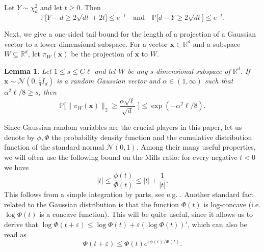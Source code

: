 \documentclass[11pt]{amsart}
\newtheorem{lemma}[theorem]{\bf Lemma}
\theoremstyle{definition}
\def\eps{\varepsilon}
\def\cN{\mathcal{N}}
\def\bR{\mathbb{R}}
\def\Pb{\mathbb{P}}
\def\bx{\boldsymbol{x}}
\begin{document}
\begin{theorem}\label{thm:laurent_massart}
Let $Y\sim\chi^2_d$ and let $t\ge0$. Then
{\smaller[0.3]
\[ \Pb\big[Y-d\ge 2\sqrt{dt}+2t\big]\le e^{-t} \quad\text{and}\quad \Pb\big[d-Y\ge 2\sqrt{dt}\big]\le e^{-t}. \]
}
\end{theorem}

Next, we give a one-sided tail bound for the length of a projection of a Gaussian vector to a lower-dimensional subspace. For a vector $\bx\in \bR^d$ and a subspace $W\subseteq \bR^d$, let $\pi_W(\bx)$ be the projection of $\bx$ to $W$.

\begin{lemma}\label{lemma:norm_projection}
Let $1\leq s\leq C\ell$ and let $W$ be any $s$-dimensional subspace of $\bR^d$. If $\bx\sim \cN(0, \frac{1}{d}I_d)$ is a random Gaussian vector and $\alpha\in (1, \infty)$ such that $\alpha^2\ell/8\geq s$, then
{\smaller[0.3]
\[\Pb\Big[\|\pi_W(\bx)\|_2\geq \frac{\alpha\sqrt{\ell}}{\sqrt{d}}\,\,\Big]\leq \exp(-\alpha^2\ell/8).\]
}
\end{lemma}


Since Gaussian random variables are the crucial players in this paper, let us denote by $\phi, \Phi$ the probability density function and the cumulative distribution function of the standard normal $\cN(0, 1)$. Among their many useful properties, we will often use the following bound on the Mills ratio: for every negative $t<0$ we have
{\smaller[0.3]
\begin{equation}\label{eqn:mills_ratio}
|t|\leq \frac{\phi(t)}{\Phi(t)}\leq |t|+\frac{1}{|t|}.
\end{equation}
}
This follows from a simple integration by parts, see e.g. \cite{Gor41}. Another standard fact related to the Gaussian distribution is that the function $\Phi(t)$ is log-concave (i.e. $\log \Phi(t)$ is a concave function). This will be quite useful, since it allows us to derive that $\log \Phi(t+\eps)\leq \log \Phi(t)+\eps (\log \Phi(t))'$, which can also be read as
{\smaller[0.3]
\begin{equation}\label{eqn:log_concavity}
    \Phi(t+\eps)\leq \Phi(t)e^{\eps\phi(t)/\Phi(t)}.
\end{equation}
}
\end{document}
